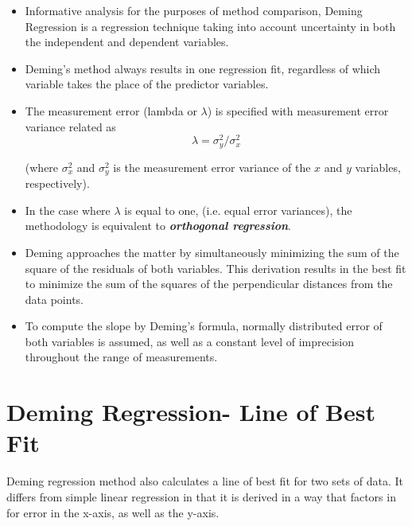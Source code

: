 \documentclass[12pt, a4paper]{report}
\theoremstyle{plain}
\theoremstyle{definition}
\theoremstyle{remark}
\begin{document}
\begin{itemize}
	\item Informative analysis for the purposes of method comparison, Deming Regression is a regression technique taking into account uncertainty in both the independent and dependent variables.
	
	\item Deming’s method always results in one regression fit, regardless of which variable takes the place of the predictor variables.
	
	
	
	\item The measurement error (lambda or $\lambda$) is specified with measurement error variance related as 
	\[\lambda = \sigma^2_y/\sigma^2_x\]
	
	(where $\sigma^2_x$ and $\sigma^2_y$ is the measurement error variance of the $x$ and $y$ variables, respectively).
	
	\item In the case where $\lambda$ is equal to one, (i.e. equal error variances), the methodology is equivalent to \textit{\textbf{orthogonal regression}}.
	
	\item Deming approaches the matter by simultaneously minimizing the sum of the square of the residuals of both variables. This derivation results in the best fit to minimize the sum of the squares of the perpendicular distances from the data points.
	
	\item To compute the slope by Deming’s formula,  normally distributed error of both variables  is assumed, as well as a constant level of imprecision throughout the range of measurements.
	
\end{itemize}
\newpage
\section{Deming Regression- Line of Best Fit}


Deming regression method also calculates a line of best fit for two sets of data. It differs from simple linear regression in that it is derived in a way that factors in for error in the x-axis, as
well as the y-axis.
\end{document}
